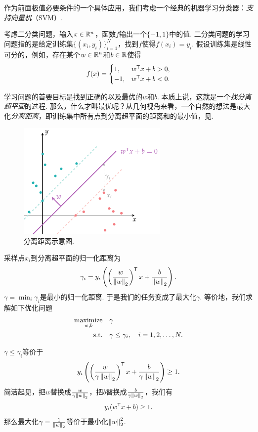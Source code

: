 作为前面极值必要条件的一个具体应用，我们考虑一个经典的机器学习分类器：\textit{支持向量机}（SVM）. 

考虑二分类问题，输入$x\in \mathbb{R}^n$，函数$f$输出一个$\{-1,1\}$中的值. 二分类问题的学习问题指的是给定训练集$\{(x_i,y_i)\}_{i=1}^N$，找到$f$使得$f(x_i)=y_i$. 假设训练集是线性可分的，例如，存在某个$w\in \mathbb{R}^n$和$b\in \mathbb{R}$使得
    \[f(x)=\begin{cases}
		1,& w^{\mathsf{T}} x+b>0,\\
		-1, &w^{\mathsf{T}} x+b<0.
	\end{cases}\]

学习问题的首要目标是找到正确的以及最优的$w$和$b$. 本质上说，这就是一个\textit{找分离超平面}的过程. 那么，什么才叫最优呢？从几何视角来看，一个自然的想法是最大化\textit{分离距离}，即训练集中所有点到分离超平面的距离和的最小值，见.
\begin{figure}[ht]
    \centering
    \includegraphics[width=0.65\textwidth]{figures/duality/svm.pdf}
    \caption{分离距离示意图.}
    \label{fig:svm}
\end{figure}

采样点$x_i$到分离超平面的归一化距离为
\[\gamma_i=y_i\left(\left(\frac{w}{\left\|w\right\|_2}\right)^{\mathsf{T}} x+\frac{b}{\left\|w\right\|_2}\right).\]
$\gamma=\min_i\gamma_i$是最小的归一化距离. 于是我们的任务变成了最大化$\gamma$. 等价地，我们求解如下优化问题
\begin{align*}
    \operatorname*{maximize}_{w,b}\quad&\gamma \\
    \text{s.t.}\quad&\gamma\le\gamma_i,\quad i=1,2,\dots,N.
\end{align*}

$\gamma\le\gamma_i$等价于
\[y_i\left(\left(\frac{w}{\gamma\left\|w\right\|_2}\right)^{\mathsf{T}} x+\frac{b}{\gamma\left\|w\right\|_2}\right)\geq 1.\]
简洁起见，把$w$替换成$\frac{w}{\gamma\left\|w\right\|_2}$，把$b$替换成$\frac{b}{\gamma\left\|w\right\|_2}$，我们有
\[y_i(w^{\mathsf{T}} x+b)\geq 1.\]
那么最大化$\gamma=\frac{1}{\left\|w\right\|_2}$等价于最小化$\left\|w\right\|_2^2$. 

